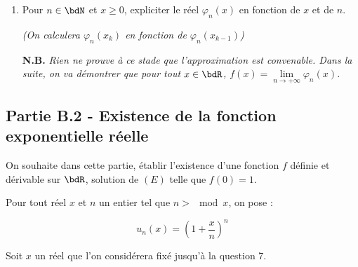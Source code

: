 \documentclass[a4paper,french,bookmarks]{article}
\begin{document}
\begin{enumerate}
    \item Pour $n \in \bdN$ et $x \geq 0$, expliciter le réel $\varphi_n(x)$ en fonction de $x$     et de $n$.
    
        \textit{(On calculera $\varphi_n(x_k)$ en fonction de $\varphi_n(x_{k-1})$)}
    
    \textbf{N.B.} \textit{Rien ne prouve à ce stade que l'approximation est convenable. Dans la suite, on va démontrer que pour tout $x \in \bdR$, $f(x) = \lim\limits_{n \to +\infty}\varphi_n(x)$.}
    
\end{enumerate}

\subsection*{Partie B.2 - Existence de la fonction exponentielle réelle}

On souhaite dans cette partie, établir l'existence d'une fonction $f$ définie et dérivable sur $\bdR$, solution de $(E)$ telle que $f(0) = 1$.

Pour tout réel $x$ et $n$ un entier tel que $n > \mod x$, on pose :

\[ u_n(x) = \left(1 + \dfrac{x}{n}\right)^n\]

Soit $x$ un réel que l'on considérera fixé jusqu'à la question 7.
\end{document}
